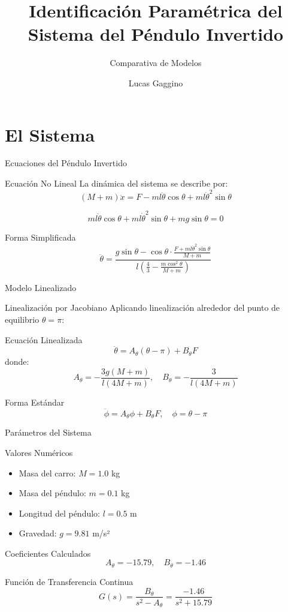 \documentclass{beamer}
\title{Identificación Paramétrica del Sistema del Péndulo Invertido}
\subtitle{Comparativa de Modelos}
\author{Lucas Gaggino}
\institute{Facultad de Ingeniería - UBA \\ Control Adaptativo 86.20}
\begin{document}
\begin{frame}
\titlepage
\end{frame}

\section{El Sistema}

\begin{frame}{Ecuaciones del Péndulo Invertido}
\begin{block}{Ecuación No Lineal}
La dinámica del sistema se describe por:
\[
(M + m) \ddot{x} = F - m l \ddot{\theta} \cos\theta + m l \dot{\theta}^2 \sin\theta
\]

\[
m l \ddot{\theta} \cos\theta + m l \dot{\theta}^2 \sin\theta + m g \sin\theta = 0
\]
\end{block}

\begin{block}{Forma Simplificada}
\[
\ddot{\theta} = \frac{g \sin\theta - \cos\theta \cdot \frac{F + m l \dot{\theta}^2 \sin\theta}{M + m}}{l \left(\frac{4}{3} - \frac{m \cos^2\theta}{M + m}\right)}
\]
\end{block}
\end{frame}

\begin{frame}{Modelo Linealizado}
\begin{block}{Linealización por Jacobiano}
Aplicando linealización alrededor del punto de equilibrio $\theta = \pi$:
\end{block}

\begin{block}{Ecuación Linealizada}
\[
\ddot{\theta} = A_\theta (\theta - \pi) + B_\theta F
\]
donde:
\[
A_\theta = -\frac{3g(M+m)}{l(4M+m)}, \quad B_\theta = -\frac{3}{l(4M+m)}
\]
\end{block}

\begin{block}{Forma Estándar}
\[
\ddot{\phi} = A_\theta \phi + B_\theta F, \quad \phi = \theta - \pi
\]
\end{block}
\end{frame}

\begin{frame}{Parámetros del Sistema}
\begin{block}{Valores Numéricos}
\begin{itemize}
\item Masa del carro: $M = 1.0$ kg
\item Masa del péndulo: $m = 0.1$ kg
\item Longitud del péndulo: $l = 0.5$ m
\item Gravedad: $g = 9.81$ m/s²
\end{itemize}
\end{block}

\begin{block}{Coeficientes Calculados}
\[
A_\theta = -15.79, \quad B_\theta = -1.46
\]
\end{block}

\begin{block}{Función de Transferencia Continua}
\[
G(s) = \frac{B_\theta}{s^2 - A_\theta} = \frac{-1.46}{s^2 + 15.79}
\]
\end{block}
\end{frame}
\end{document}
